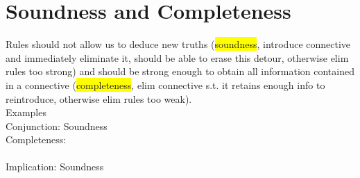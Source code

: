 \section{Soundness and Completeness}
Rules should not allow us to deduce new truths
(\colorbox{yellow}{soundness}, introduce connective and immediately
eliminate it, should be able to erase this detour, otherwise elim
rules too strong) and should
be strong enough to obtain all information contained in a connective
(\colorbox{yellow}{completeness}, elim connective s.t. it retains enough
info to reintroduce, otherwise elim rules too weak).
\\ Examples
\\ Conjunction: Soundness
\\Completeness:
\\
\\ Implication: Soundness
